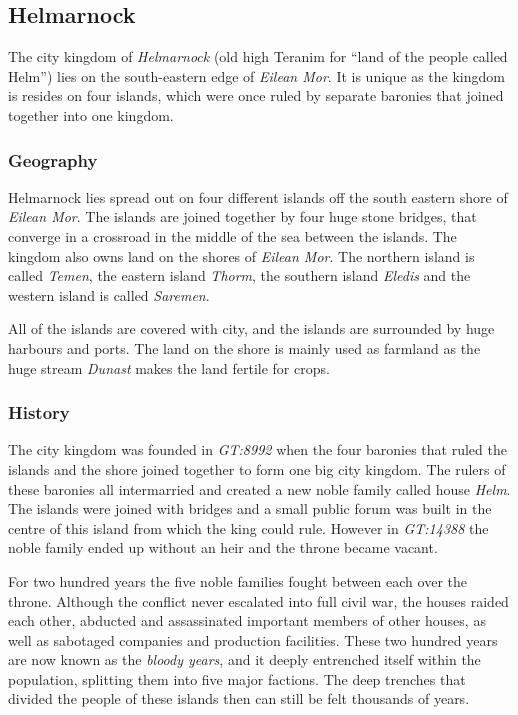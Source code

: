 \subsection*{Helmarnock}

The city kingdom of \emph{Helmarnock} (old high Teranim for ``land of the
people called Helm'') lies on the south-eastern edge of \emph{Eilean Mor}. It
is unique as the kingdom is resides on four islands, which were once ruled by
separate baronies that joined together into one kingdom.

\subsubsection*{Geography}

Helmarnock lies spread out on four different islands off the south eastern
shore of \emph{Eilean Mor}. The islands are joined together by four huge
stone bridges, that converge in a crossroad in the middle of the sea between
the islands. The kingdom also owns land on the shores of \emph{Eilean Mor}.
The northern island is called \emph{Temen}, the eastern island \emph{Thorm},
the southern island \emph{Eledis} and the western island is called
\emph{Saremen}.

All of the islands are covered with city, and the islands are surrounded by
huge harbours and ports. The land on the shore is mainly used as farmland as
the huge stream \emph{Dunast} makes the land fertile for crops.

\subsubsection*{History}

The city kingdom was founded in \emph{GT:8992} when the four baronies that
ruled the islands and the shore joined together to form one big city kingdom.
The rulers of these baronies all intermarried and created a new noble family
called house \emph{Helm}. The islands were joined with bridges and a small
public forum was built in the centre of this island from which the king could
rule. However in \emph{GT:14388} the noble family ended up without an heir and
the throne became vacant.

For two hundred years the five noble families fought between each over the
throne. Although the conflict never escalated into full civil war, the houses
raided each other, abducted and assassinated important members of other
houses, as well as sabotaged companies and production facilities. These two
hundred years are now known as the \emph{bloody years}, and it deeply
entrenched itself within the population, splitting them into five major
factions. The deep trenches that divided the people of these islands then can
still be felt thousands of years.

